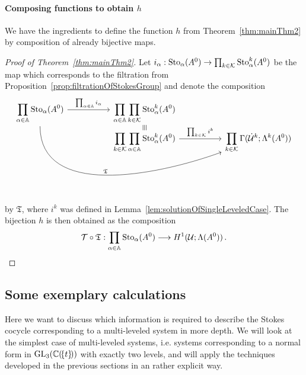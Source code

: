 \paragraph{Composing functions to obtain $h$}
We have the ingredients to define the function $h$ from
Theorem~\ref{thm:mainThm2} by composition of already bijective maps.
\begin{proof}[Proof of Theorem~\ref{thm:mainThm2}]
  Let $i_\alpha:\operatorname{Sto}_\alpha(A^0)\to\prod_{k\in\mathcal{K}}\operatorname{Sto}_\alpha^k(A^0)$ be the
  map which corresponds to the filtration from
  Proposition~\ref{prop:filtrationOfStokesGroup} and
  denote the composition
  \[ \begin{tikzcd}[column sep=1.8cm,row sep=-0.2cm]
      \displaystyle \prod_{\alpha\in\A}\Sto_\alpha(A^0)
      \rar{\prod_{\alpha\in\A}i_\alpha}
      \arrow[ddrr, out=270,in=200,"\mathfrak{T}"]
      & \displaystyle \prod_{\alpha\in\A}\prod_{k\in\cK}\Sto_\alpha^k(A^0)
    \\ &\text{\rotatebox[origin=c]{-90}{$\equiv$}}
    \\ &\displaystyle \prod_{k\in\cK}\prod_{\alpha\in\A}\Sto_\alpha^k(A^0)
      \rar{\prod_{k\in\cK}i^k}
      & \displaystyle \prod_{k\in\cK}\Gamma(\dot\cU^k;\Lambda^k(A^0))
  \end{tikzcd} \]
  by $\mathfrak{T}$, where $i^k$ was defined in
  Lemma~\ref{lem:solutionOfSingleLeveledCase}.
  The bijection $h$ is then obtained as the composition
  \[
    \mathcal{T}\circ\mathfrak{T}: \prod_{\alpha\in\mathbb{A}}\operatorname{Sto}_\alpha(A^0)
    \longrightarrow H^1(\mathcal{U};\Lambda(A^0)) \,.
  \]
\end{proof}

\subsection{Some exemplary calculations}\label{sec:WhichInformationIsNeeded}
Here we want to discuss which information is required to describe the Stokes
cocycle corresponding to a multi-leveled system in more depth.
We will look at the simplest case of multi-leveled systems, i.e. systems
corresponding to a normal form in $\operatorname{GL}_3(\mathbb{C}(\!\{t\}\!))$ with exactly two
levels, and will apply the techniques developed in the previous sections in an
rather explicit way.

